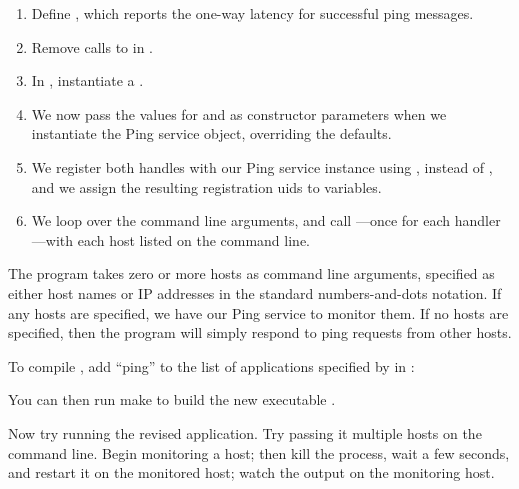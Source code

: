 \begin{enumerate}

\item Define , which reports the one-way
  latency for successful ping messages.

\item Remove calls to  in
  .

\item In , instantiate a
  .

\item We now pass the values for  and
   as constructor parameters when we
  instantiate the Ping service object, overriding the defaults.

\item We register both handles with our Ping service instance using
  , instead of
  , and we assign the resulting
  registration uids to variables.

\item We loop over the command line arguments, and call
  ---once for each handler---with each host listed
  on the command line.

\end{enumerate}


The program takes zero or more hosts as command line arguments,
specified as either host names or IP addresses in the standard
numbers-and-dots notation.  If any hosts are specified, we have our
Ping service to monitor them.  If no hosts are specified, then the
program will simply respond to ping requests from other hosts.

To compile , add ``ping'' to the list of
applications specified by  in
:



You can then run make to build the new executable .

Now try running the revised  application.  Try passing
it multiple hosts on the command line.  Begin monitoring a host; then
kill the  process, wait a few seconds, and restart it on
the monitored host; watch the output on the monitoring host.


